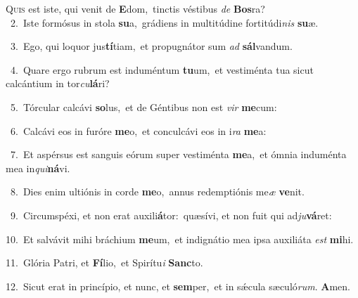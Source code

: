 \lettrine{\initial\textcolor{\initialcolor}{Q}}{uis} est iste, qui venit de \textbf{E}\-dom,~\star tinctis véstibus \textit{de} \textbf{Bos}\-ra?\\
{\numbfont\textcolor{\numbcolor}{~2.}}~Iste formósus in stola \textbf{su}\-a,~\star grádiens in multitúdine fortitúdi\textit{nis} \textbf{su}\-æ.\par
{\numbfont\textcolor{\numbcolor}{~3.}}~Ego, qui loquor jus\-\textbf{tí}\-tiam,~\star et propugnátor sum \textit{ad} \textbf{sál}\-vandum.\par
{\numbfont\textcolor{\numbcolor}{~4.}}~Quare ergo rubrum est induméntum \textbf{tu}\-um,~\star et vestiménta tua sicut calcántium in tor\-\textit{cu}\-\textbf{lá}ri?\par
{\numbfont\textcolor{\numbcolor}{~5.}}~Tórcular calcávi \textbf{so}\-lus,~\star et de Géntibus non est \textit{vir} \textbf{me}\-cum:\par
{\numbfont\textcolor{\numbcolor}{~6.}}~Calcávi eos in furóre \textbf{me}\-o,~\star et conculcávi eos in i\textit{ra} \textbf{me}\-a:\par
{\numbfont\textcolor{\numbcolor}{~7.}}~Et aspérsus est sanguis eórum super vestiménta \textbf{me}\-a,~\star et ómnia induménta mea in\-\textit{qui}\-\textbf{ná}vi.\par
{\numbfont\textcolor{\numbcolor}{~8.}}~Dies enim ultiónis in corde \textbf{me}\-o,~\star annus redemptiónis me\textit{æ} \textbf{ve}\-nit.\par
{\numbfont\textcolor{\numbcolor}{~9.}}~Circumspéxi, et non erat auxili\-\textbf{á}\-tor:~\star quæsívi, et non fuit qui ad\-\textit{ju}\-\textbf{vá}ret:\par
{\numbfont\textcolor{\numbcolor}{10.}}~Et salvávit mihi bráchium \textbf{me}\-um,~\star et indignátio mea ipsa auxiliáta \textit{est} \textbf{mi}\-hi.\par
{\numbfont\textcolor{\numbcolor}{11.}}~Glória Patri, et \textbf{Fí}\-lio,~\star et Spirítu\textit{i} \textbf{Sanc}\-to.\par
{\numbfont\textcolor{\numbcolor}{12.}}~Sicut erat in princípio, et nunc, et \textbf{sem}\-per,~\star et in sǽcula sæculó\-\textit{rum}\-. \textbf{A}\-men.\par
